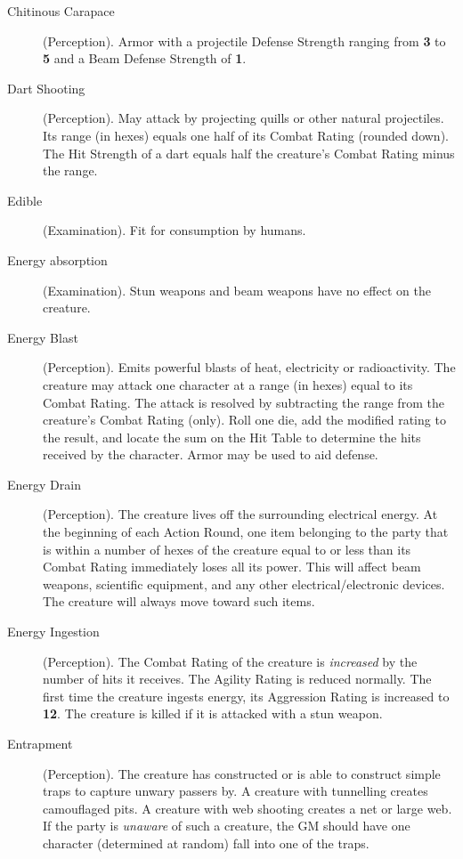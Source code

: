 \begin{description}
\item[Chitinous Carapace] (Perception). Armor with a projectile
  Defense Strength ranging from \textbf{3} to \textbf{5} and a Beam Defense Strength of \textbf{1}.

\item[Dart Shooting] (Perception). May attack by projecting quills
  or other natural projectiles. Its range (in hexes) equals one half of
  its Combat Rating (rounded down).  The Hit Strength of a dart equals
  half the creature's Combat Rating minus the range.

\item[Edible] (Examination).  Fit for consumption by humans.

\item[Energy absorption] (Examination).  Stun weapons and beam
  weapons have no effect on the creature.

\item[Energy Blast] (Perception). Emits powerful blasts of heat,
  electricity or radioactivity. The creature may attack one character at
  a range (in hexes) equal to its Combat Rating. The attack is resolved
  by subtracting the range from the creature's Combat Rating (only).
  Roll one die, add the modified rating to the result, and locate the
  sum on the Hit Table to determine the hits received by the character.
  Armor may be used to aid defense.

\item[Energy Drain] (Perception). The creature lives off the
  surrounding electrical energy. At the beginning of each Action Round,
  one item belonging to the party that is within a number of hexes of
  the creature equal to or less than its Combat Rating immediately loses
  all its power. This will affect beam weapons, scientific equipment,
  and any other electrical/electronic devices. The creature will always
  move toward such items.

\item[Energy Ingestion] (Perception). The Combat Rating of the
  creature is \emph{increased} by the number of hits it receives. The
  Agility Rating is reduced normally. The first time the creature
  ingests energy, its Aggression Rating is increased to \textbf{12}. The
  creature is killed if it is attacked with a stun weapon.

\item[Entrapment] (Perception). The creature has constructed or is
  able to construct simple traps to capture unwary passers by. A
  creature with tunnelling creates camouflaged pits. A creature with web
  shooting creates a net or large web. If the party is \emph{unaware} of
  such a creature, the GM should have one character (determined at
  random) fall into one of the traps.


\end{description}
